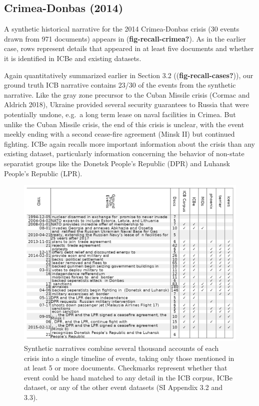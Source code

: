 \documentclass{article}
\begin{document}
\hypertarget{crimea-donbas-2014}{%
\subsection{Crimea-Donbas (2014)}\label{crimea-donbas-2014}}

A synthetic historical narrative for the 2014 Crimea-Donbas crisis (30
events drawn from 971 documents) appears in
(\textbf{fig-recall-crimea?}). As in the earlier case, rows represent
details that appeared in at least five documents and whether it is
identified in ICBe and existing datasets.

Again quantitatively summarized earlier in Section 3.2
((\textbf{fig-recall-cases?})), our ground truth ICB narrative contains
23/30 of the events from the synthetic narrative. Like the gray zone
precursor to the Cuban Missile crisis (Cormac and Aldrich 2018), Ukraine
provided several security guarantees to Russia that were potentially
undone, e.g.~a long term lease on naval facilities in Crimea. But unlike
the Cuban Missile crisis, the end of this crisis is unclear, with the
event meekly ending with a second cease-fire agreement (Minsk II) but
continued fighting. ICBe again recalls more important information about
the crisis than any existing dataset, particularly information
concerning the behavior of non-state separatist groups like the Donetsk
People's Republic (DPR) and Luhansk People's Republic (LPR).

\begin{figure}
\hypertarget{fig-recall-crimea}{%
\centering
\includegraphics{case_study_crimea_recall.png}
\caption{Synthetic narratives combine several thousand accounts of each
crisis into a single timeline of events, taking only those mentioned in
at least 5 or more documents. Checkmarks represent whether that event
could be hand matched to any detail in the ICB corpus, ICBe dataset, or
any of the other event datasets (SI Appendix 3.2 and
3.3).}\label{fig-recall-crimea}
}
\end{figure}
\end{document}
